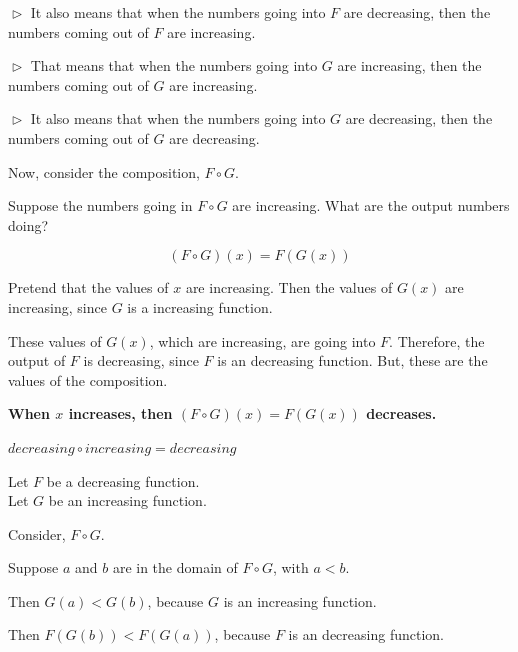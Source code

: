 \documentclass{ximera}
\begin{document}
$\vartriangleright$ It also means that when the numbers going into $F$ are decreasing, then the numbers coming out of $F$ are increasing. 



$\vartriangleright$ That means that when the numbers going into $G$ are increasing, then the numbers coming out of $G$ are increasing. 


$\vartriangleright$ It also means that when the numbers going into $G$ are decreasing, then the numbers coming out of $G$ are decreasing. 



Now, consider the composition, $F \circ G$. 


Suppose the numbers going in $F \circ G$ are increasing.  What are the output numbers doing? 




\[ (F \circ G)(x) = F(G(x)) \]


Pretend that the values of $x$ are increasing. Then the values of $G(x)$ are increasing, since $G$ is a increasing function.

These values of $G(x)$, which are increasing, are going into $F$.  Therefore, the output of $F$ is decreasing, since $F$ is an decreasing function.  But, these are the values of the composition.


\begin{center}
\textbf{\textcolor{red!70!black}{When $x$ increases, then $(F \circ G)(x) = F(G(x))$ decreases.}}
\end{center}



\begin{fact}
$decreasing \circ increasing = decreasing$


Let $F$ be a decreasing function. \\
Let $G$ be an increasing function. 


Consider, $F \circ G$.

Suppose $a$ and $b$ are in the domain of $F \circ G$, with $a < b$. 

Then $G(a) < G(b)$, because $G$ is an increasing function. 

Then $F(G(b)) < F(G(a))$, because $F$ is an decreasing function.


\end{fact}
\end{document}
